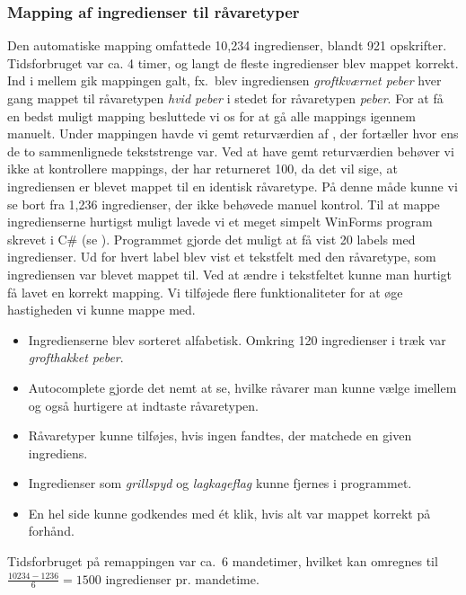 \subsubsection{Mapping af ingredienser til råvaretyper}
Den automatiske mapping omfattede 10,234 ingredienser, blandt 921 opskrifter. Tidsforbruget var ca. 4 timer, og langt de fleste ingredienser blev mappet korrekt. Ind i mellem gik mappingen galt, fx.\ blev ingrediensen \textit{groftkværnet peber} hver gang mappet til råvaretypen \textit{hvid peber} i stedet for råvaretypen \textit{peber}. For at få en bedst muligt mapping besluttede vi os for at gå alle mappings igennem manuelt. Under mappingen havde vi gemt returværdien af , der fortæller hvor ens de to sammenlignede tekststrenge var. Ved at have gemt returværdien behøver vi ikke at kontrollere mappings, der har returneret 100, da det vil sige, at ingrediensen er blevet mappet til en identisk råvaretype. På denne måde kunne vi se bort fra 1,236 ingredienser, der ikke behøvede manuel kontrol.
Til at mappe ingredienserne hurtigst muligt lavede vi et meget simpelt WinForms program skrevet i C\# (se ). Programmet gjorde det muligt at få vist 20 labels med ingredienser. Ud for hvert label blev vist et tekstfelt med den råvaretype, som ingrediensen var blevet mappet til. Ved at ændre i tekstfeltet kunne man hurtigt få lavet en korrekt mapping. Vi tilføjede flere funktionaliteter for at øge hastigheden vi kunne mappe med.

\begin{itemize} [noitemsep]
\item Ingredienserne blev sorteret alfabetisk. Omkring 120 ingredienser i træk var \textit{grofthakket peber}.
\item Autocomplete gjorde det nemt at se, hvilke råvarer man kunne vælge imellem og også hurtigere at indtaste råvaretypen.
\item Råvaretyper kunne tilføjes, hvis ingen fandtes, der matchede en given ingrediens.
\item Ingredienser som \fx \textit{grillspyd} og \textit{lagkageflag} kunne fjernes i programmet.
\item En hel side kunne godkendes med ét klik, hvis alt var mappet korrekt på forhånd.
\end{itemize}

Tidsforbruget på remappingen var ca.\ 6 mandetimer, hvilket kan omregnes til $\frac{10234 - 1236}{6} = 1500$ ingredienser pr. mandetime.
